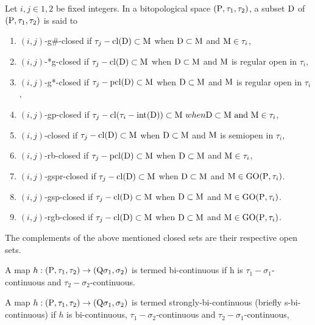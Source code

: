 \begin{dfn}\label{dfn1.6.1}
Let $i, j\in {1, 2}$ be fixed integers. In a bitopological space $(\mathrm{P}, \tau_1, \tau_2)$, a subset $\mathrm{D}$ of $(\mathrm{P}, \tau_1, \tau_2)$ is said to
\begin{enumerate}[\rm (i)]
\item $(i, j)$-g\#-closed \cite{key34} if $\tau_j- \mathrm{cl}(\mathrm{D})\subset \mathrm{M}$ when $\mathrm{D}\subset\mathrm{M}$ and $\mathrm{M}\in \tau_i$,
\item $(i, j)$-*g-closed \cite{key3} if $\tau_j- \mathrm{cl}(\mathrm{D})\subset\mathrm{M}$ when $\mathrm{D}\subset\mathrm{M}$ and $\mathrm{M}$ is regular open in $\tau_i$,
\item $(i, j)$-g*-closed \cite{key40} if $\tau_j-\mbox{pcl}(\mathrm{D}) \subset\mathrm{M}$ when $\mathrm{D}\subset\mathrm{M}$ and $\mathrm{M}$ is regular open in $\tau_i$,
\item $(i, j)$-gp-closed \cite{key35} if $\tau_j-\cl(\tau_i-\mbox{int}(\clrD))\subset\TSM\ when \clrD\subset\TSM\ \mbox{and}\ \TSM\in\tau_i$,
\item $(i, j)$-closed \cite{key83} if $\tau_j-\mathrm{cl}(\mathrm{D}) \subset \mathrm{M}$ when $\mathrm{D}\subset\mathrm{M}$ and $\mathrm{M}$ is semiopen in $\tau_i$,
\item $(i, j)$-rb-closed \cite{key46} if $\tau_j- \mbox{pcl}(\mathrm{D}) \subset\mathrm{M}$ when $\mathrm{D}\subset\mathrm{M}$ and $\mathrm{M}\in\tau_i$,
\item $(i, j)$-gspr-closed \cite{key85} if $\tau_j-\mathrm{cl}(\mathrm{D}) \subset \mathrm{M}$ when $\mathrm{D} \subset \mathrm{M}$ and $\mathrm{M}\in\mbox{GO}(\mathrm{P}, \tau_i)$.
\item $(i, j)$-gsp-closed \cite{key85} if $\tau_j- \mathrm{cl}(\mathrm{D}) \subset \mathrm{M}$ when $\mathrm{D} \subset \mathrm{M}$ and $\mathrm{M}\in \mbox{GO}(\mathrm{P}, \tau_i)$.
\item $(i, j)$-rgb-closed \cite{key85} if $\tau_j- \mathrm{cl}(\mathrm{D}) \subset \mathrm{M}$ when $\mathrm{D} \subset \mathrm{M}$ and $\mathrm{M}\in \mbox{GO}(\mathrm{P}, \tau_i)$.
\end{enumerate}
\end{dfn}

The complements of the above mentioned closed sets are their respective open sets. 
\begin{dfn}\label{dfn1.6.2}
A map $h: (\mathrm{P}, \tau_1, \tau_2)\rightarrow(\mathrm{Q} \sigma_1, \sigma_2)$ is termed bi-continuous \cite{key55} if h is $\tau_1-\sigma_1$-continuous and $\tau_2-\sigma_2$-continuous.
\end{dfn}

\begin{dfn}\label{dfn1.6.3}
A map $h: (\mathrm{P}, \tau_1, \tau_2)\rightarrow(\mathrm{Q} \sigma_1, \sigma_2)$ is termed strongly-bi-continuous \cite{key55} (briefly s-bi-continuous) if $h$ is bi-continuous, $\tau_1-\sigma_2$-continuous and $\tau_2-\sigma_1$-continuous,
\end{dfn}

